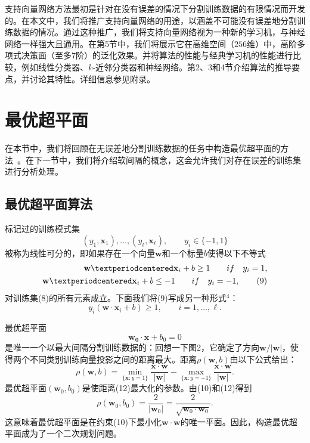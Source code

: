 \documentclass[lang=cn,11pt,a4paper]{elegantpaper}
\newcommand{\upcite}[1]{\textsuperscript{\textsuperscript{\cite{#1}}}}
\begin{document}
	支持向量网络方法最初是针对在没有误差的情况下分割训练数据的有限情况而开发的。在本文中，我们将推广支持向量网络的用途，以涵盖不可能没有误差地分割训练数据的情况。通过这种推广，我们将支持向量网络视为一种新的学习机，与神经网络一样强大且通用。在第5节中，我们将展示它在高维空间（$256$维）中，高阶多项式决策面（至多$7$阶）的泛化效果。并将算法的性能与经典学习机的性能进行比较，例如线性分类器、$k$-近邻分类器和神经网络。第2、3和4节介绍算法的推导要点，并讨论其特性。详细信息参见附录。

	\section{最优超平面}
	在本节中，我们将回顾在无误差地分割训练数据的任务中构造最优超平面的方法~\upcite{vapnik1982estimation}。在下一节中，我们将介绍软间隔的概念，这会允许我们对存在误差的训练集进行分析处理。
	\subsection{最优超平面算法}
	标记过的训练模式集
	\begin{equation}
		(y_1,\mathbf{x}_1),\ldots,(y_\ell,\mathbf{x}_\ell),\qquad y_i\in\{-1,1\}\tag{8}
	\end{equation}
	被称为线性可分的，即如果存在一个向量$\mathbf{w}$和一个标量$b$使得以下不等式
	\begin{align}
		\mathbf{w}·\mathbf{x}_i+b\geq1\qquad if\quad y_i=1,\notag \\
		\mathbf{w}·\mathbf{x}_i+b\leq-1\qquad if\quad y_i=-1,\tag{9}
	\end{align}
	对训练集(8)的所有元素成立。下面我们将(9)写成另一种形式$^4$：
	\begin{equation}
		y_i(\mathbf{w}·\mathbf{x}_i+b)\geq1,\qquad i=1,\ldots,\ell.\tag{10}
	\end{equation}

	最优超平面
	\begin{equation}
		\mathbf{w_0·x}+b_0=0\tag{11}
	\end{equation}
	是唯一一个以最大间隔分割训练数据的：回想一下图2，它确定了方向$\mathbf{w}/|\mathbf{w}|$，使得两个不同类别训练向量投影之间的距离最大。距离$\rho(\mathbf{w},b)$由以下公式给出：
	\begin{equation}
		\rho(\mathbf{w},b)=\min_{\{\mathbf{x}:y=1\}}\frac{\mathbf{x·w}}{|\mathbf{w}|}-\max_{\{\mathbf{x}:y=-1\}}\frac{\mathbf{x·w}}{|\mathbf{w}|}\tag{12}.
	\end{equation}
	最优超平面$(\mathbf{w}_0,b_0)$是使距离(12)最大化的参数。由(10)和(12)得到
	\begin{equation}
		\rho(\mathbf{w}_0,b_0)=\frac{2}{|\mathbf{w}_0|}=\frac{2}{\sqrt{\mathbf{w}_0·\mathbf{w}_0}}.\tag{13}
	\end{equation}
	这意味着最优超平面是在约束(10)下最小化$\mathbf{w·w}$的唯一平面。因此，构造最优超平面成为了一个二次规划问题。
\end{document}

